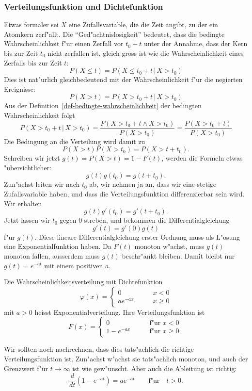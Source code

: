 \subsubsection{Verteilungsfunktion und Dichtefunktion}
Etwas formaler sei $X$ eine Zufallsvariable, die die Zeit angibt, zu der
ein Atomkern zerf"allt. Die ``Ged"achtnislosigkeit'' bedeutet, dass die
bedingte Wahrscheinlichkeit f"ur einen Zerfall vor $t_0+t$ unter der
Annahme, dass der Kern bis zur Zeit $t_0$ nicht zerfallen ist, gleich
gross ist wie die Wahrscheinlichkeit eines Zerfalls bis zur Zeit $t$:
\[
P(X \le t) = P(X\le t_0+t\,|\,X > t_0)
\]
Dies ist nat"urlich gleichbedeutend mit der Wahrscheinlichkeit f"ur
die negierten Ereignisse:
\[
P(X > t) = P(X > t_0+t\,|\,X > t_0)
\]
Aus der Definition~\ref{def-bedingte-wahrscheinlichkeit}
der bedingten Wahrscheinlichkeit folgt
\[
P(X> t_0+t\,|\,X>t_0)=\frac{P(X>t_0+t\wedge X>t_0)}{P(X > t_0)}
=\frac{P(X>t_0+t)}{P(X>t_0)}
\]
Die Bedingung an die Verteilung wird damit zu
\[
P(X>t)P(X>t_0)=P(X>t+t_0).
\]
Schreiben wir jetzt $g(t)=P(X>t)=1-F(t)$, werden die Formeln
etwas "ubersichtlicher:
\[
g(t)g(t_0)=g(t+t_0).
\]
Zun"achst leiten wir nach $t_0$ ab, wir nehmen ja an, dass wir
eine stetige Zufallsvariable haben, und dass die Verteilungsfunktion
differenzierbar sein wird.
Wir erhalten
\[
g(t)g'(t_0)=g'(t+t_0).
\]
Jetzt lassen wir $t_0$ gegen $0$ streben, und bekommen
die Differentialgleichung
\[
g'(t)=g'(0)g(t)
\]
f"ur $g(t)$.
Diese lineare Differentialgleichung erster Ordnung
muss als L"osung eine Exponentialfunktion haben. Da $F(t)$
monoton w"achst, muss $g(t)$ monoton fallen, ausserdem
muss $g(t)$ beschr"ankt bleiben. Damit bleibt nur
$g(t)=e^{-at}$ mit einem positiven $a$.

\begin{definition}
Die Wahrscheinlichkeitsverteilung mit Dichtefunktion
\[
\varphi(x)=\begin{cases}
0&\qquad x<0\\
a e^{-a x}&\qquad x\ge 0
\end{cases}
\]
mit $a>0$ heisst Exponentialverteilung.
Ihre Verteilungsfunktion ist
\[
F(x)=\begin{cases}
0&\qquad\text{f"ur $x < 0$}\\
1-e^{-ax}&\qquad\text{f"ur $x\ge 0$}.
\end{cases}
\]
\end{definition}
Wir sollten noch nachrechnen, dass dies tats"achlich die richtige
Verteilungsfunktion ist. Zun"achst w"achst sie tats"achlich monoton,
und auch der Grenzwert f"ur $t\to\infty$ ist wie gew"unscht. Aber
auch die Ableitung ist richtig:
\[
\frac{d}{dt}(1-e^{-at})=ae^{-at}\qquad\text{f"ur}\quad t>0.
\]

